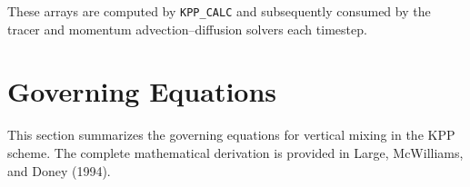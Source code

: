 \documentclass[12pt,letterpaper]{article}
\begin{document}
These arrays are computed by \texttt{KPP\_CALC} and subsequently consumed  
by the tracer and momentum advection--diffusion solvers each timestep.  
  
\section{Governing Equations}  
\label{sec:governing_equations}  
  
This section summarizes the governing equations for vertical mixing  
in the KPP scheme. The complete mathematical derivation is provided  
in Large, McWilliams, and Doney (1994).  
  
\end{document}
